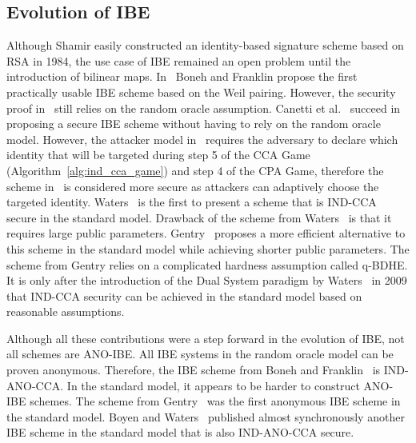 
\subsection{Evolution of IBE}
Although Shamir easily constructed an identity-based signature scheme based on RSA in 1984, the use case of IBE remained an open problem until the introduction of bilinear maps. In~\cite{art:BonehF01} Boneh and Franklin propose the first practically usable IBE scheme based on the Weil pairing. However, the security proof in~\cite{art:BonehF01} still relies on the random oracle assumption. Canetti et al.~\cite{art:CanettiHK03} succeed in proposing a secure IBE scheme without having to rely on the random oracle model. However, the attacker model in~\cite{art:CanettiHK03} requires the adversary to declare which identity \id{} that will be targeted during step 5 of the CCA Game (Algorithm~\ref{alg:ind_cca_game}) and step 4 of the CPA Game, therefore the scheme in~\cite{art:BonehF01} is considered more secure as attackers can adaptively choose the targeted identity.  
Waters~\cite{art:Waters05} is the first to present a scheme that is IND-CCA secure in the standard model. Drawback of the scheme from Waters~\cite{art:Waters05} is that it requires large public parameters. Gentry~\cite{art:Gentry06} proposes a more efficient alternative to this scheme in the standard model while achieving shorter public parameters. The scheme from Gentry relies on a complicated hardness assumption called q-BDHE. It is only after the introduction of the Dual System paradigm by Waters~\cite{art:Waters09} in 2009 that IND-CCA security can be achieved in the standard model based on reasonable assumptions.

Although all these contributions were a step forward in the evolution of IBE, not all schemes are ANO-IBE. All IBE systems in the random oracle model can be proven anonymous. Therefore, the IBE scheme from Boneh and Franklin~\cite{art:BonehF01} is IND-ANO-CCA. In the standard model, it appears to be harder to construct ANO-IBE schemes. The scheme from Gentry~\cite{art:Gentry06} was the first anonymous IBE scheme in the standard model. Boyen and Waters~\cite{art:BoyenW06} published almost synchronously another IBE scheme in the standard model that is also IND-ANO-CCA secure.

